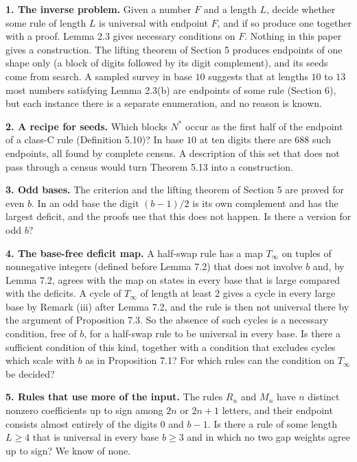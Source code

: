 \documentclass[11pt,letterpaper]{article}
\theoremstyle{paperstyle}
\theoremstyle{paperstyledef}
\theoremstyle{paperstylerem}
\begin{document}
\textbf{1. The inverse problem.} Given a number \(F\) and a length \(L\), decide whether some rule of length \(L\) is universal with endpoint \(F\), and if so produce one together with a proof. Lemma 2.3 gives necessary conditions on \(F\). Nothing in this paper gives a construction. The lifting theorem of Section 5 produces endpoints of one shape only (a block of digits followed by its digit complement), and its seeds come from search. A sampled survey in base \(10\) suggests that at lengths \(10\) to \(13\) most numbers satisfying Lemma 2.3(b) are endpoints of some rule (Section 6), but each instance there is a separate enumeration, and no reason is known.

\textbf{2. A recipe for seeds.} Which blocks \(N^*\) occur as the first half of the endpoint of a class-C rule (Definition 5.10)? In base \(10\) at ten digits there are \(688\) such endpoints, all found by complete census. A description of this set that does not pass through a census would turn Theorem 5.13 into a construction.

\textbf{3. Odd bases.} The criterion and the lifting theorem of Section 5 are proved for even \(b\). In an odd base the digit \((b-1)/2\) is its own complement and has the largest deficit, and the proofs use that this does not happen. Is there a version for odd \(b\)?

\textbf{4. The base-free deficit map.} A half-swap rule has a map \(T_\infty\) on tuples of nonnegative integers (defined before Lemma 7.2) that does not involve \(b\) and, by Lemma 7.2, agrees with the map on states in every base that is large compared with the deficits. A cycle of \(T_\infty\) of length at least \(2\) gives a cycle in every large base by Remark (iii) after Lemma 7.2, and the rule is then not universal there by the argument of Proposition 7.3. So the absence of such cycles is a necessary condition, free of \(b\), for a half-swap rule to be universal in every base. Is there a sufficient condition of this kind, together with a condition that excludes cycles which scale with \(b\) as in Proposition 7.1? For which rules can the condition on \(T_\infty\) be decided?

\textbf{5. Rules that use more of the input.} The rules \(R_n\) and \(M_n\) have \(n\) distinct nonzero coefficients up to sign among \(2n\) or \(2n+1\) letters, and their endpoint consists almost entirely of the digits \(0\) and \(b-1\). Is there a rule of some length \(L \geq 4\) that is universal in every base \(b \geq 3\) and in which no two gap weights agree up to sign? We know of none.
\end{document}
